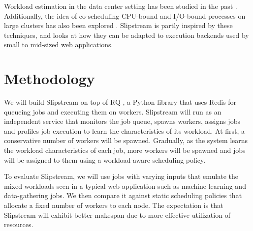 \documentclass{proc}
\begin{document}
Workload estimation in the data center setting has been studied in the past
\cite{186175, 8478443, 5279616}. Additionally, the idea of co-scheduling
CPU-bound and I/O-bound processes on large clusters has also been explored
\cite{5279616, 10.1109/TPDS.2003.1206505}. Slipstream is partly inspired by
these techniques, and looks at how they can be adapted to execution backends
used by small to mid-sized web applications.

\section{Methodology}

We will build Slipstream on top of RQ \cite{RQ}, a Python library that uses Redis
for queueing jobs and executing them on workers. Slipstream will run as an
independent service that monitors the job queue, spawns workers, assigns jobs
and profiles job execution to learn the characteristics of its workload. At
first, a conservative number of workers will be spawned. Gradually, as the
system learns the workload characteristics of each job, more workers will be
spawned and jobs will be assigned to them using a workload-aware scheduling
policy.

To evaluate Slipstream, we will use jobs with varying inputs that emulate the
mixed workloads seen in a typical web application such as machine-learning and
data-gathering jobs. We then compare it against static scheduling policies that
allocate a fixed number of workers to each node. The expectation is that
Slipstream will exhibit better makespan due to more effective utilization of
resources.

\printbibliography
\end{document}
